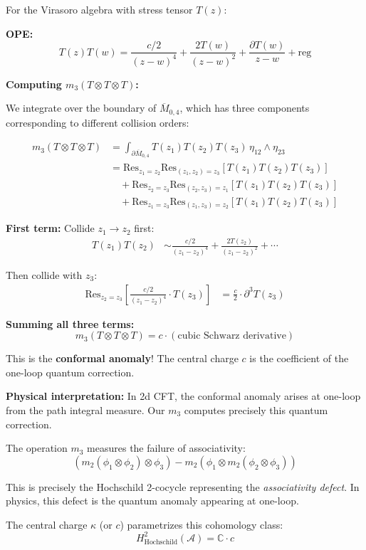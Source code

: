 \begin{computation}
\label{comp:virasoro-m3}
For the Virasoro algebra with stress tensor $T(z)$:

\textbf{OPE:}
$$T(z)T(w) = \frac{c/2}{(z-w)^4} + \frac{2T(w)}{(z-w)^2} + \frac{\partial T(w)}{z-w} 
+ \text{reg}$$

\textbf{Computing $m_3(T \otimes T \otimes T)$:}

We integrate over the boundary of $\overline{M}_{0,4}$, which has three components 
corresponding to different collision orders:

\begin{align*}
m_3(T \otimes T \otimes T) &= \int_{\partial\overline{M}_{0,4}} 
T(z_1)T(z_2)T(z_3) \, \eta_{12} \wedge \eta_{23} \\
&= \text{Res}_{z_1=z_2}\text{Res}_{(z_1,z_2)=z_3}[T(z_1)T(z_2)T(z_3)] \\
&\quad + \text{Res}_{z_2=z_3}\text{Res}_{(z_2,z_3)=z_1}[T(z_1)T(z_2)T(z_3)] \\
&\quad + \text{Res}_{z_1=z_3}\text{Res}_{(z_1,z_3)=z_2}[T(z_1)T(z_2)T(z_3)]
\end{align*}

\textbf{First term:} Collide $z_1 \to z_2$ first:
\begin{align*}
T(z_1)T(z_2) &\sim \frac{c/2}{(z_1-z_2)^4} + \frac{2T(z_2)}{(z_1-z_2)^2} + \cdots
\end{align*}

Then collide with $z_3$:
\begin{align*}
\text{Res}_{z_2=z_3}\left[\frac{c/2}{(z_1-z_2)^4} \cdot T(z_3)\right] 
&= \frac{c}{2} \cdot \partial^3 T(z_3)
\end{align*}

\textbf{Summing all three terms:}
$$m_3(T \otimes T \otimes T) = c \cdot (\text{cubic Schwarz derivative})$$

This is the \textbf{conformal anomaly}! The central charge $c$ is the coefficient of 
the one-loop quantum correction.

\textbf{Physical interpretation:} In 2d CFT, the conformal anomaly arises at one-loop 
from the path integral measure. Our $m_3$ computes precisely this quantum correction.
\end{computation}

\begin{remark}
\label{rem:m3-hochschild}
The operation $m_3$ measures the failure of associativity:
$$(m_2(\phi_1 \otimes \phi_2) \otimes \phi_3) - m_2(\phi_1 \otimes m_2(\phi_2 
\otimes \phi_3))$$

This is precisely the Hochschild 2-cocycle representing the \emph{associativity defect}. 
In physics, this defect is the quantum anomaly appearing at one-loop.

The central charge $\kappa$ (or $c$) parametrizes this cohomology class:
$$H^2_{\text{Hochschild}}(\mathcal{A}) = \mathbb{C} \cdot c$$
\end{remark}

